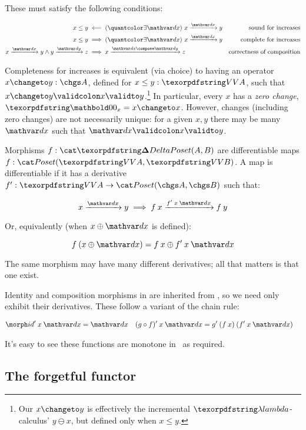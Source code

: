 \noindent
These must satisfy the following conditions:

\nopagebreak[2]
\begin{align*}
  x \le y &\impliedby \ex{\dx} \vld{\dx} x y
  & \text{sound for increases}\\
  x \le y &\implies \ex{\dx} \vld{\dx} x y
  & \text{complete for increases}\\
  \vld\dx x y \wedge \vld\dy y z &\implies \vld{\dx\compose\dy} x z
  & \text{correctness of composition}
\end{align*}

\noindent Completeness for increases is equivalent (via choice) to having an
operator $x \changeto y : \chgs A$, defined for $x \le y : \vals A$, such that
$\valid{x \changeto y} x y$.\footnote{Our $x \changeto y$ is effectively the
  incremental $\fn$-calculus' $y \ominus x$, but defined only when $x \le y$.}
In particular, every $x$ has a \emph{zero change}, $\zero_x = x \changeto x$.
However, changes (including zero changes) are not necessarily unique: for a
given $x,y$ there may be many $\dx$ such that $\valid\dx x y$.

Morphisms $f : \CP(A, B)$ are differentiable maps $f : \Poset(\vals A, \vals
B)$. A map is differentiable if it has a derivative $\deriv f : \vals A \to
\Poset(\chgs A, \chgs B)$ such that:

\nopagebreak[2]
\[ \vld{\dx} x y \implies \vld{\deriv f\<x\<\dx}{f\<x}{f\<y}\]

\noindent Or, equivalently (when $x \upd \dx$ is defined):

\nopagebreak[2]
\[ f\<(x \upd \dx) = f\<x \upd \deriv f\<x\<\dx \]

\noindent
The same morphism may have many different derivatives; all that matters is that
one exist.

Identity and composition morphisms in \CP{} are inherited from \Poset{}, so we
need only exhibit their derivatives. These follow a variant of the chain rule:

\nopagebreak[2]
\begin{align*}
  \deriv\id \<x\<\dx &= \dx
  & \deriv{(g \circ f)} \<x\<\dx &= \deriv g \<(f\<x) \<(\deriv f\<x\<\dx)
\end{align*}

\noindent
It's easy to see these functions are monotone in \dx\ as required.


\subsection{\texorpdfstring{\boldmath}{}The forgetful functor \valfn}
\label{sec:CP-vals}

